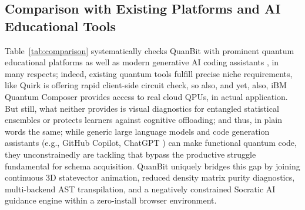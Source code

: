 \documentclass[conference]{IEEEtran}
\begin{document}
\subsection{Comparison with Existing Platforms and AI Educational Tools}
Table~\ref{tab:comparison} systematically checks QuanBit with prominent quantum educational platforms as well as modern generative AI coding assistants \cite{b16}, in many respects; indeed, existing quantum tools fulfill precise niche requirements, like Quirk is offering rapid client-side circuit check, so also, and yet, also, iBM Quantum Composer provides access to real cloud QPUs, in actual application. But still, what neither provides is visual diagnostics for entangled statistical ensembles or protects learners against cognitive offloading; and thus, in plain words the same; while generic large language models and code generation assistants (e.g., GitHub Copilot, ChatGPT \cite{b16}) can make functional quantum code, they unconstrainedly are tackling that bypass the productive struggle fundamental for schema acquisition. QuanBit uniquely bridges this gap by joining continuous 3D statevector animation, reduced density matrix purity diagnostics, multi-backend AST transpilation, and a negatively constrained Socratic AI guidance engine within a zero-install browser environment.
\end{document}
